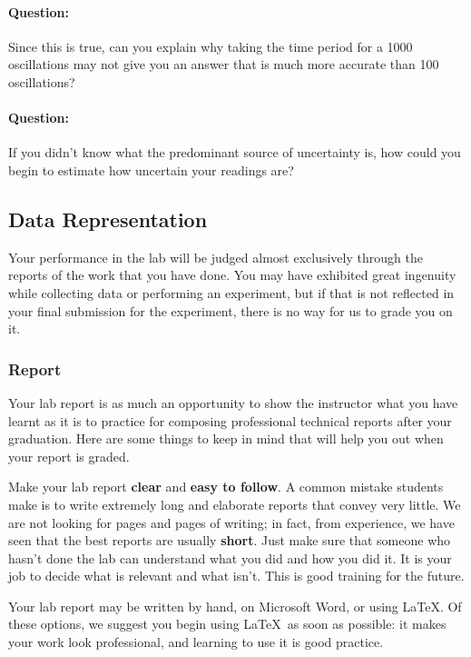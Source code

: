 \begin{question}
\paragraph{Question:} Since this is true, can you explain why taking the time period for a 1000 oscillations may not give you an answer that is much more accurate than 100 oscillations? ~\\

\paragraph{Question:} If you didn't know what the predominant source of uncertainty is, how could you begin to estimate how uncertain your readings are?
\end{question}

\subsection{Data Representation}

Your performance in the lab will be judged almost exclusively through the reports of the work that you have done. You may have exhibited great ingenuity while collecting data or performing an experiment, but if that is not reflected in your final submission for the experiment, there is no way for us to grade you on it.

\subsubsection{Report}

Your lab report is as much an opportunity to show the instructor what you have learnt as it is to practice for composing professional technical reports after your graduation. Here are some things to keep in mind that will help you out when your report is graded.

Make your lab report \textbf{clear} and \textbf{easy to follow}. A common mistake students make is to write extremely long and elaborate reports that convey very little. We are not looking for pages and pages of writing; in fact, from experience, we have seen that the best reports are usually \textbf{short}. Just make sure that someone who hasn't done the lab can understand what you did and how you did it. It is your job to decide what is relevant and what isn't. This is good training for the future. 

\begin{imp}
Your lab report may be written by hand, on Microsoft Word, or using \LaTeX. Of these options, we suggest you begin using \LaTeX\, as soon as possible: it makes your work look professional, and learning to use it is good practice.
\end{imp}

